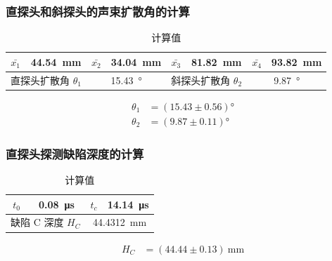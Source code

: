 \documentclass[a4paper,utf8]{article}
\begin{document}
        \subsubsection{直探头和斜探头的声束扩散角的计算}
            \begin{table}[!ht]\caption{计算值}
                \centering\begin{tabular}{c c|c c|c c|c c}\hline
                    $\bar{x_1}$ & \SI{44.54}{\mm} & $\bar{x_2}$ & \SI{34.04}{\mm}& $\bar{x_3}$ & \SI{81.82}{\mm} & $\bar{x_4}$ & \SI{93.82}{\mm}\\ \hline
                    \multicolumn{2}{c}{直探头扩散角 $\theta_1$} & \multicolumn{2}{c}{\SI{15.43}{\degree}} & \multicolumn{2}{c}{斜探头扩散角 $\theta_2$} & \multicolumn{2}{c}{\SI{9.87}{\degree}} \\ \hline
                \end{tabular}
            \end{table}\par
            \begin{align*}
                \theta_1 &= (15.43 \pm 0.56) \unit{\degree}\\
                \theta_2 &= (9.87 \pm 0.11) \unit{\degree}
            \end{align*}
        \subsubsection{直探头探测缺陷深度的计算}
        \begin{table}[!ht]\caption{计算值}
            \centering\begin{tabular}{c c|c c}\hline
                $t_0$ & \SI{0.08}{\us} & $t_c$ & \SI{14.14}{\us}\\ \hline
                \multicolumn{2}{c}{缺陷 C 深度 $H_C$} & \multicolumn{2}{c}{\SI{44.4312}{\mm}} \\ \hline
            \end{tabular}
        \end{table}\par
            \begin{align*}
                H_C &= (44.44 \pm 0.13) ~\unit{\mm}
            \end{align*}
\end{document}
